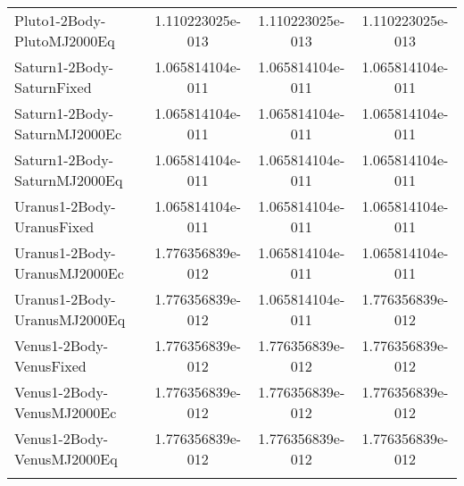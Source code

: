 \begin{table}[htbp!]
\begin{tabular}{lccc}
         Pluto1-2Body-PlutoMJ2000Eq & 1.110223025e-013 & 1.110223025e-013 & 1.110223025e-013 \\
         Saturn1-2Body-SaturnFixed & 1.065814104e-011 & 1.065814104e-011 & 1.065814104e-011 \\
         Saturn1-2Body-SaturnMJ2000Ec & 1.065814104e-011 & 1.065814104e-011 & 1.065814104e-011 \\
         Saturn1-2Body-SaturnMJ2000Eq & 1.065814104e-011 & 1.065814104e-011 & 1.065814104e-011 \\
         Uranus1-2Body-UranusFixed & 1.065814104e-011 & 1.065814104e-011 & 1.065814104e-011 \\
         Uranus1-2Body-UranusMJ2000Ec & 1.776356839e-012 & 1.065814104e-011 & 1.065814104e-011 \\
         Uranus1-2Body-UranusMJ2000Eq & 1.776356839e-012 & 1.065814104e-011 & 1.776356839e-012 \\
         Venus1-2Body-VenusFixed & 1.776356839e-012 & 1.776356839e-012 & 1.776356839e-012 \\
         Venus1-2Body-VenusMJ2000Ec & 1.776356839e-012 & 1.776356839e-012 & 1.776356839e-012 \\
         Venus1-2Body-VenusMJ2000Eq & 1.776356839e-012 & 1.776356839e-012 & 1.776356839e-012 \\
      \hline\hline
      \label{Table: WinGMAT-LinuxGMAT CS Parameters Set 2} 
\end{tabular}
\end{table}
